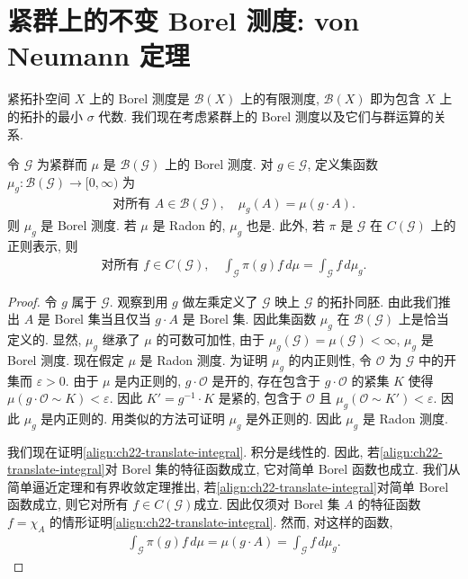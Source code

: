 \documentclass[../../main.tex]{subfiles}
\begin{document}
\section{紧群上的不变 Borel 测度: von Neumann 定理}\label{section:ch22-haar}

紧拓扑空间 $X$ 上的 Borel 测度是 $\mathcal{B}(X)$ 上的有限测度, $\mathcal{B}(X)$ 即为包含 $X$ 上的拓扑的最小 $\sigma$ 代数. 我们现在考虑紧群上的 Borel 测度以及它们与群运算的关系.

\begin{lemma}[左平移测度]\label{lemma:ch22-left-translate}
令 $\mathcal{G}$ 为紧群而 $\mu$ 是 $\mathcal{B}(\mathcal{G})$ 上的 Borel 测度. 对 $g\in\mathcal{G}$, 定义集函数 $\mu_{g}:\mathcal{B}(\mathcal{G})\to[0,\infty)$ 为
\begin{align*}
\text{对所有 }A\in\mathcal{B}(\mathcal{G}),\quad\mu_{g}(A)=\mu(g\cdot A).
\end{align*}
则 $\mu_{g}$ 是 Borel 测度. 若 $\mu$ 是 Radon 的, $\mu_{g}$ 也是. 此外, 若 $\pi$ 是 $\mathcal{G}$ 在 $C(\mathcal{G})$ 上的正则表示, 则
\begin{align}
\text{对所有 }f\in C(\mathcal{G}),\quad\int_{\mathcal{G}}\pi(g)f\,d\mu=\int_{\mathcal{G}}f\,d\mu_{g}.
\label{align:ch22-translate-integral}
\end{align}
\end{lemma}

\begin{proof}
令 $g$ 属于 $\mathcal{G}$. 观察到用 $g$ 做左乘定义了 $\mathcal{G}$ 映上 $\mathcal{G}$ 的拓扑同胚. 由此我们推出 $A$ 是 Borel 集当且仅当 $g\cdot A$ 是 Borel 集. 因此集函数 $\mu_{g}$ 在 $\mathcal{B}(\mathcal{G})$ 上是恰当定义的. 显然, $\mu_{g}$ 继承了 $\mu$ 的可数可加性, 由于 $\mu_{g}(\mathcal{G})=\mu(\mathcal{G})<\infty$, $\mu_{g}$ 是 Borel 测度. 现在假定 $\mu$ 是 Radon 测度. 为证明 $\mu_{g}$ 的内正则性, 令 $\mathcal{O}$ 为 $\mathcal{G}$ 中的开集而 $\varepsilon>0$. 由于 $\mu$ 是内正则的, $g\cdot\mathcal{O}$ 是开的, 存在包含于 $g\cdot\mathcal{O}$ 的紧集 $K$ 使得 $\mu(g\cdot\mathcal{O}\sim K)<\varepsilon$. 因此 $K'=g^{-1}\cdot K$ 是紧的, 包含于 $\mathcal{O}$ 且 $\mu_{g}(\mathcal{O}\sim K')<\varepsilon$. 因此 $\mu_{g}$ 是内正则的. 用类似的方法可证明 $\mu_{g}$ 是外正则的. 因此 $\mu_{g}$ 是 Radon 测度.

我们现在证明\eqref{align:ch22-translate-integral}. 积分是线性的. 因此, 若\eqref{align:ch22-translate-integral}对 Borel 集的特征函数成立, 它对简单 Borel 函数也成立. 我们从简单逼近定理和有界收敛定理推出, 若\eqref{align:ch22-translate-integral}对简单 Borel 函数成立, 则它对所有 $f\in C(\mathcal{G})$成立. 因此仅须对 Borel 集 $A$ 的特征函数 $f=\chi_{A}$ 的情形证明\eqref{align:ch22-translate-integral}. 然而, 对这样的函数,
\begin{align*}
\int_{\mathcal{G}}\pi(g)f\,d\mu=\mu(g\cdot A)=\int_{\mathcal{G}}f\,d\mu_{g}.
\end{align*}
\end{proof}
\end{document}

